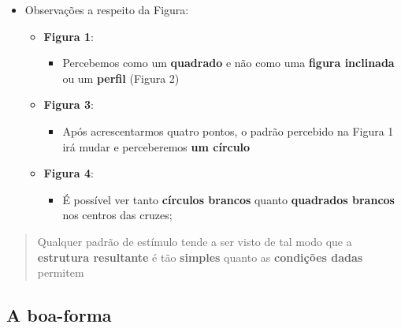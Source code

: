\documentclass[
]{book}
\providecommand{\tightlist}{%
  \setlength{\itemsep}{0pt}\setlength{\parskip}{0pt}}
\begin{document}
\begin{itemize}
\tightlist
\item
  Observações a respeito da Figura:

  \begin{itemize}
  \tightlist
  \item
    \textbf{Figura 1}:

    \begin{itemize}
    \tightlist
    \item
      Percebemos como um \textbf{quadrado} e não como uma \textbf{figura inclinada} ou um \textbf{perfil} (Figura 2)
    \end{itemize}
  \item
    \textbf{Figura 3}:

    \begin{itemize}
    \tightlist
    \item
      Após acrescentarmos quatro pontos, o padrão percebido na Figura 1 irá mudar e perceberemos \textbf{um círculo}
    \end{itemize}
  \item
    \textbf{Figura 4}:

    \begin{itemize}
    \tightlist
    \item
      É possível ver tanto \textbf{círculos brancos} quanto \textbf{quadrados brancos} nos centros das cruzes;
    \end{itemize}
  \end{itemize}
\end{itemize}

\begin{quote}
Qualquer padrão de estímulo tende a ser visto de tal modo que a \textbf{estrutura resultante} é tão \textbf{simples} quanto as \textbf{condições dadas} permitem
\end{quote}

\hypertarget{a-boa-forma}{%
\subsection{A boa-forma}\label{a-boa-forma}}
\end{document}
